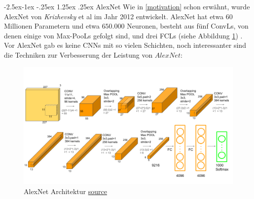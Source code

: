\documentclass[12pt,a4paper]{scrartcl}
\makeatletter
\numberwithin{equation}{section}
\renewcommand\paragraph{\@startsection{paragraph}{4}{\z@}%
	{-2.5ex\@plus -1ex \@minus -.25ex}%
	{1.25ex \@plus .25ex}%
	{\normalfont\normalsize\bfseries}}
\makeatother
\begin{document}
\paragraph{AlexNet}
Wie in \ref{motivation} schon erwähnt, wurde AlexNet von \textit{Krizhevsky} et al \cite{AlexNet} im Jahr 2012 entwickelt. AlexNet hat etwa $ 60 $ Millionen Parametern und etwa $ 650.000 $ Neuronen, besteht aus fünf \acsp{ConvL}, von denen einige von Max-\acsp{PooL} gefolgt sind, und drei \acsp{FCL} (siehe Abbildung \ref{fig:AlexNet})  \cite{AlexNet}. Vor  AlexNet  gab es keine \acsp{CNN} mit so vielen Schichten, noch interessanter sind die Techniken zur Verbesserung der Leistung von  $ AlexNet $:
\begin{figure}[h!]
	\centering
	\includegraphics[width=\textwidth ]{AlexNet}
	\caption{ AlexNet Architektur \href{https://neurohive.io/en/popular-networks/alexnet-imagenet-classification-with-deep-convolutional-neural-networks/}{ source} }
	\label{fig:AlexNet}
\end{figure}
\end{document}
